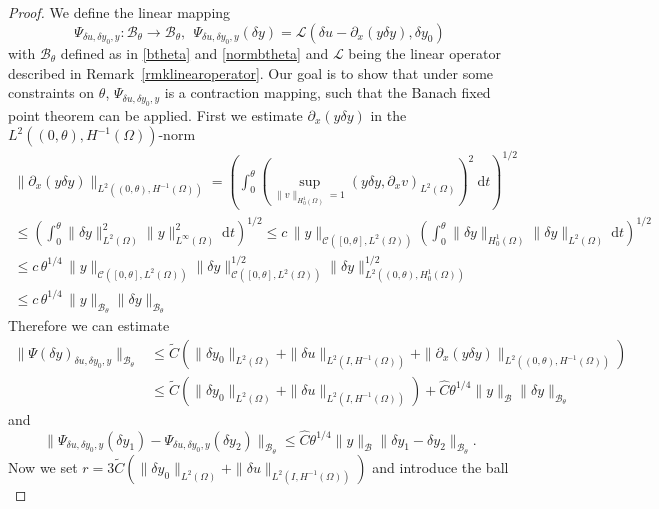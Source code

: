 \begin{proof}
{\color{red}
We define the linear mapping
\[
\Psi_{\delta u, \delta y_0,y}\colon \mathcal B_{\theta}\rightarrow \mathcal B_{\theta},~~\Psi_{\delta u, \delta y_0,y}(\delta y) = \mathcal{L}(\delta u - \partial_x(y\delta y),\delta y_0)
\]
with $\mathcal B_{\theta}$ defined as in \eqref{btheta} and \eqref{normbtheta} and $\mathcal{L}$ being the linear \KdV operator described in Remark~\ref{rmklinearoperator}. Our goal is to show that under some constraints on $\theta$, $\Psi_{\delta u, \delta y_0,y}$ is a contraction mapping, such that the Banach fixed point theorem can be applied. First we estimate $\partial_x(y \delta y)$ in the $L^2((0,\theta),H^{-1}(\Omega))$-norm
\begin{multline}\label{estimate_variable_coefficient}
\|\partial_x(y\delta y)\|_{L^2((0,\theta),H^{-1}(\Omega))}=\left(\int_{0}^{\theta}\left(\underset{\|v\|_{H^1_0(\Omega)}=1}{\operatorname{sup}}(y\delta y,\partial_x v)_{L^2(\Omega)}\right)^2~\mathrm dt\right)^{1/2}\\
\leq\left(\int_{0}^{\theta}\|\delta y\|_{L^2(\Omega)}^2\|y\|_{L^\infty(\Omega)}^2~\mathrm dt\right)^{1/2}\leq c\,\|y\|_{\mathcal C([0,\theta],L^2(\Omega))}\left(\int_{0}^{\theta}\|\delta y\|_{H^1_0(\Omega)}\|\delta y\|_{L^2(\Omega)}~\mathrm dt\right)^{1/2}\\
\leq c\,\theta^{1/4}\,\|y\|_{\mathcal C([0,\theta],L^2(\Omega))}\|\delta y\|_{\mathcal C([0,\theta],L^2(\Omega))}^{1/2}\|\delta y\|_{L^2((0,\theta),H^1_0(\Omega))}^{1/2}\\
\leq c\,\theta^{1/4}\,\|y\|_{\mathcal B_{\theta}}\|\delta y\|_{\mathcal B_{\theta}}
\end{multline}
Therefore we can estimate
\begin{align*}
\|\Psi(\delta y)_{\delta u, \delta y_0,y}\|_{\mathcal B_{\theta}} & \leq \widetilde{C}\left(\|\delta y_0\|_{L^2(\Omega)}+\|\delta u\|_{L^2(I,H^{-1}(\Omega))}+\|\partial_x(y\delta y)\|_{L^2((0,\theta),H^{-1}(\Omega))}\right)\\
&\leq \widetilde{C}\left(\|\delta y_0\|_{L^2(\Omega)}+\|\delta u\|_{L^2(I,H^{-1}(\Omega))}\right) + \hat C\theta^{1/4}\|y\|_{\mathcal B}\|\delta y\|_{\mathcal B_{\theta}}
\end{align*}
and
\[
\|\Psi_{\delta u, \delta y_0,y}(\delta y_1)-\Psi_{\delta u, \delta y_0,y}(\delta y_2)\|_{\mathcal B_{\theta}}\leq \hat C\theta^{1/4}\|y\|_{\mathcal B}\|\delta y_1-\delta y_2\|_{\mathcal B_{\theta}}.
\]
Now we set $r=3 \widetilde{C}\left(\|\delta y_0\|_{L^2(\Omega)}+\|\delta u\|_{L^2(I,H^{-1}(\Omega))}\right)$ and introduce the ball
}
\end{proof}
